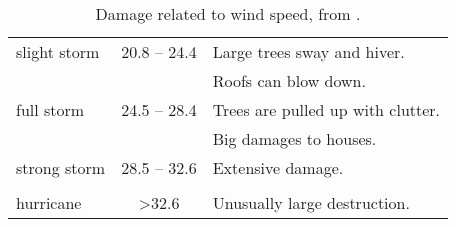 \begin{table}[h!]
	\begin{center}
		\caption{Damage related to wind speed, from \cite{faeraas_urd_2016}. }\label{tab:wind}
		\begin{tabular}{l|c|l}
			\hline \hline
			slight storm& \SI{20.8}{\mPs} -- \SI{24.4}{\mPs}&  Large trees sway and hiver. \\
			&  &  Roofs can blow down. \\ \hline
			full storm & \SI{24.5}{\mPs} -- \SI{28.4}{\mPs}& Trees are pulled up with clutter. \\
			&  & Big damages to houses.\\ \hline
			strong storm & \SI{28.5}{\mPs} -- \SI{32.6}{\mPs}& Extensive damage.\\
			&  & \\ \hline
			hurricane & \textgreater \SI{32.6}{\mPs}& Unusually large destruction.\\
			\hline \hline
		\end{tabular}
	\end{center}
\end{table}
